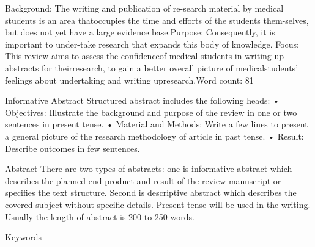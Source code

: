 Background: The writing and publication of re-search material by medical students is an area thatoccupies the time and efforts of the students them-selves, but does not yet have a large evidence base.Purpose: Consequently, it is important to under-take research that expands this body of knowledge.
Focus: This review aims to assess the confidenceof medical students in writing up abstracts for theirresearch, to gain a better overall picture of medicalstudents’ feelings about undertaking and writing upresearch.Word count: 81

Informative Abstract
Structured abstract includes the following heads: 
• Objectives: Illustrate the background and purpose of the review in one or two sentences in present tense.
• Material and Methods: Write a few lines to present a general picture of the research methodology of article in past tense.
• Result: Describe outcomes in few sentences. 

Abstract
There are two types of abstracts: one is informative abstract which describes the planned end product and result of the review manuscript or specifies the text structure. Second is descriptive abstract which describes the covered subject without specific details. Present tense will be used in the writing. Usually the length of abstract is 200 to 250 words.


Keywords

